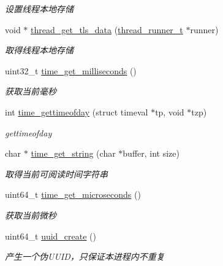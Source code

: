 \begin{DoxyCompactItemize}
\begin{DoxyCompactList}\small\item\em 设置线程本地存储 \end{DoxyCompactList}\item 
void $\ast$ \hyperlink{a00109_ga63c9be5b8fb04c0b26382f51b7bdf237_ga63c9be5b8fb04c0b26382f51b7bdf237}{thread\+\_\+get\+\_\+tls\+\_\+data} (\hyperlink{a00051_a9054159cde2f926ef61c28ce1e555199_a9054159cde2f926ef61c28ce1e555199}{thread\+\_\+runner\+\_\+t} $\ast$runner)
\begin{DoxyCompactList}\small\item\em 取得线程本地存储 \end{DoxyCompactList}\item 
uint32\+\_\+t \hyperlink{a00082_a528d27a7218cb2fdabf81ca343e24fc9_a528d27a7218cb2fdabf81ca343e24fc9}{time\+\_\+get\+\_\+milliseconds} ()
\begin{DoxyCompactList}\small\item\em 获取当前毫秒 \end{DoxyCompactList}\item 
int \hyperlink{a00082_a3cab12b4908938ca999206a67c8ee032_a3cab12b4908938ca999206a67c8ee032}{time\+\_\+gettimeofday} (struct timeval $\ast$tp, void $\ast$tzp)
\begin{DoxyCompactList}\small\item\em gettimeofday \end{DoxyCompactList}\item 
char $\ast$ \hyperlink{a00082_a6d3f7fda67a3c61f767f7b2dbfcbe4ee_a6d3f7fda67a3c61f767f7b2dbfcbe4ee}{time\+\_\+get\+\_\+string} (char $\ast$buffer, int size)
\begin{DoxyCompactList}\small\item\em 取得当前可阅读时间字符串 \end{DoxyCompactList}\item 
uint64\+\_\+t \hyperlink{a00082_a5eb6de730bc28be3fbc402b9841c1819_a5eb6de730bc28be3fbc402b9841c1819}{time\+\_\+get\+\_\+microseconds} ()
\begin{DoxyCompactList}\small\item\em 获取当前微秒 \end{DoxyCompactList}\item 
uint64\+\_\+t \hyperlink{a00082_a2b1df51bc127460a3bf25949068bfe92_a2b1df51bc127460a3bf25949068bfe92}{uuid\+\_\+create} ()
\begin{DoxyCompactList}\small\item\em 产生一个伪\+U\+U\+I\+D，只保证本进程内不重复 \end{DoxyCompactList}\item 

\end{DoxyCompactItemize}
